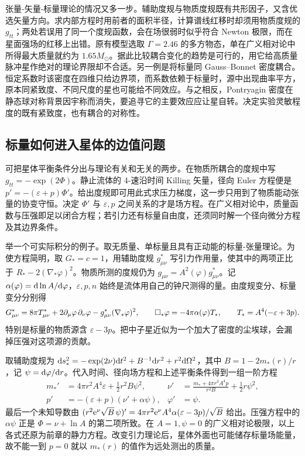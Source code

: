 张量-矢量-标量理论的情况又多一步。辅助度规与物质度规既有共形因子，又含优选矢量方向。求内部方程时用前者的面积半径，计算谱线红移时却须用物质度规的 $g_{tt}$；两处若误用了同一个度规函数，会在场很弱时似乎符合 Newton 极限，而在星面强场的红移上出错。原有模型选取 $\Gamma=2.46$ 的多方物态，单在广义相对论中所得最大质量就约为 $1.65M_\odot$。据此比较耦合变化的趋势是可行的，用它给高质量脉冲星作绝对的理论界限却不合适。另一例是将标量同 Gauss--Bonnet 密度耦合。恒定系数时该密度在四维只给边界项，而系数依赖于标量时，源中出现曲率平方，原本同紧致度、不同尺度的星也可能给不同效应。与之相反，Pontryagin 密度在静态球对称背景因宇称而消失，要追寻它的主要效应应让星自转。决定实验灵敏程度的既有紧致度，也有耦合的对称性。

\subsection{标量如何进入星体的边值问题}

可把星体平衡条件分出与理论有关和无关的两步。在物质所耦合的度规中写 $g_{tt}=-\exp(2\Phi)$。静止流体的 4-速沿时间 Killing 矢量，径向 Euler 方程便是 $p'=-(\varepsilon+p)\Phi'$。给出度规即可用此式求压力梯度，这一步只用到了物质能动张量的协变守恒。决定 $\Phi'$ 与 $\varepsilon,p$ 之间关系的才是场方程。在广义相对论中，质量函数与压强即足以闭合方程；若引力还有标量自由度，还须同时解一个径向微分方程及其边界条件。

举一个可实际积分的例子。取无质量、单标量且具有正动能的标量-张量理论。为使方程简明，取 $G_*=c=1$，用辅助度规 $g^*_{\mu\nu}$ 写引力作用量，使其中的两项正比于 $R_*-2(\nabla_*\varphi)^2$。物质所测的度规仍为 $g_{\mu\nu}=A^2(\varphi)g^*_{\mu\nu}$。记 $\alpha(\varphi)=\dd\ln A/\dd\varphi$，$\varepsilon,p,n$ 始终是流体用自己的钟尺测得的量。由度规变分、标量变分分别得
\[
 G^*_{\mu\nu}=8\pi T^*_{\mu\nu}
       +2\partial_\mu\varphi\,\partial_\nu\varphi-g^*_{\mu\nu}(\nabla_*\varphi)^2,
 \qquad
 \square_*\varphi=-4\pi\alpha(\varphi)T_*,
 \qquad T_*=A^4(-\varepsilon+3p).
\]
特别是标量的物质源含 $\varepsilon-3p$。把中子星近似为一个加大了密度的尘埃球，会漏掉压强对这项源的贡献。

取辅助度规为 $\dd s_*^2=-\exp(2\nu)\dd t^2+B^{-1}\dd r^2+r^2\dd\Omega^2$，其中 $B=1-2m_*(r)/r$，记 $\psi=\dd\varphi/\dd r$。代入时间、径向场方程和上述平衡条件得到一组一阶方程
\begin{align*}
 m_*'&=4\pi r^2 A^4\varepsilon+\tfrac12r^2B\psi^2,
 &\nu'&=\frac{m_*+4\pi r^3A^4p}{r^2B}+\tfrac12r\psi^2,\\
 p'&=-(\varepsilon+p)(\nu'+\alpha\psi),
 &\varphi'&=\psi .
\end{align*}
最后一个未知导数由 $(r^2\mathrm{e}^\nu\sqrt B\,\psi)'=4\pi r^2\mathrm{e}^\nu A^4\alpha(\varepsilon-3p)/\sqrt B$ 给出。压强方程中的 $\alpha\psi$ 正是 $\Phi=\nu+\ln A$ 的第二项所致。在 $A=1,\psi=0$ 的广义相对论极限，以上各式还原为前章的静力方程。改变引力理论后，星体外面也可能储存标量场能量，故不能一到 $p=0$ 就以 $m_*(r)$ 的值作为远处测出的质量。

